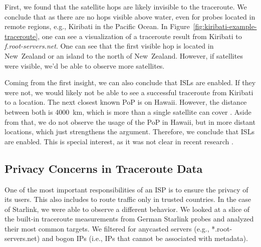 First, we found that the satellite hops are likely invisible to the traceroute.
We conclude that as there are no hops visible above water, even for probes
located in remote regions, e.g., Kiribati in the Pacific Ocean. In
Figure~\ref{fig:kiribati-example-traceroute}, one can see a visualization of a
traceroute result from Kiribati to \textit{f.root-servers.net}. One can see
that the first visible hop is located in New~Zealand or an island to the north
of New~Zealand. However, if satellites were visible, we'd be able to observe
more satellites.

Coming from the first insight, we can also conclude that \ac{ISLs} are enabled.
If they were not, we would likely not be able to see a successful traceroute
from Kiribati to a location. The next closest known \ac{PoP} is on Hawaii.
However, the distance between both is 4000~km, which is more than a single
satellite can cover \cite{Pekhterev2021}. Aside from that, we do not observe the usage of the
\ac{PoP} in Hawaii, but in more distant locations, which just strengthens the
argument. Therefore, we conclude that \ac{ISLs} are enabled. This is special
interest, as it was not clear in recent research \cite{DBLP:conf/hotnets/HauriBGS20}.


\subsection*{Privacy Concerns in Traceroute Data}

One of the most important responsibilities of an \ac{ISP} is to ensure the
privacy of its users. This also includes to route traffic only in trusted
countries. In the case of Starlink, we were able to observe a different
behavior. We looked at a slice of the built-in traceroute measurements from
German Starlink probes and analyzed their most common targets. We filtered for
anycasted servers (e.g., *.root-servers.net) and bogon IPs (i.e., IPs that
cannot be associated with metadata).

